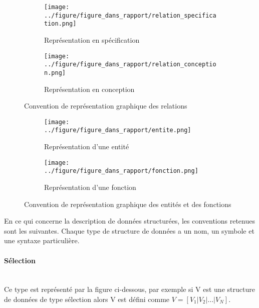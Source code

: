 \vspace{-1cm}

\begin{figure}[H]
    \centering
    \begin{subfigure}[b]{0.4\textwidth}
        \texttt{[image: ../figure/figure\_dans\_rapport/relation\_specification.png]}
        \caption{Représentation en spécification}
        \label{fig:relation_specification}
    \end{subfigure}
    \begin{subfigure}[b]{0.4\textwidth}
        \texttt{[image: ../figure/figure\_dans\_rapport/relation\_conception.png]}
        \caption{Représentation en conception}
        \label{fig:relation_conception}
    \end{subfigure}
    \caption{Convention de représentation graphique des relations}
    \label{fig:convention_representation_relation}
\end{figure}

\vspace{-1cm}

\begin{figure}[H]
    \centering
    \begin{subfigure}[b]{0.4\textwidth}
        \texttt{[image: ../figure/figure\_dans\_rapport/entite.png]}
        \caption{Représentation d'une entité}
        \label{fig:convention_entite}
    \end{subfigure}
    \begin{subfigure}[b]{0.4\textwidth}
        \texttt{[image: ../figure/figure\_dans\_rapport/fonction.png]}
        \caption{Représentation d'une fonction}
        \label{fig:convention_fonction}
    \end{subfigure}
    \caption{Convention de représentation graphique des entités et des fonctions}
    \label{fig:convention_representation_entite_fonction}
\end{figure}

\newpage

En ce qui concerne la description de données structurées, les conventions retenues sont les suivantes. Chaque type de structure de données a un nom, un symbole et une syntaxe particulière.

\paragraph{Sélection} ~~\\ \noindent
Ce type est représenté par la figure ci-dessous, par exemple si V est une structure de données de type sélection alors V est défini comme $V=[V_1|V_2|\ldots|V_N]$.

